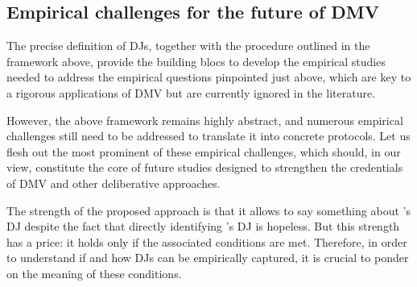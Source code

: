 \documentclass[version=3.21, pagesize, twoside=off, bibliography=totoc, DIV=calc, fontsize=12pt, a4paper, french, english]{scrartcl}
\begin{document}

\subsection{Empirical challenges for the future of \ac{DMV}}

The precise definition of \acp{DJ}, together with the procedure outlined in the framework above, provide the building blocs to develop the empirical studies needed to address the empirical questions pinpointed just above, which are key to a rigorous applications of \ac{DMV} but are currently ignored in the literature.


However, the above framework remains highly abstract, and numerous empirical challenges still need to be addressed to translate it into concrete protocols. Let us flesh out the most prominent of these empirical challenges, which should, in our view, constitute the core of future studies designed to strengthen the credentials of \ac{DMV} and other deliberative approaches. 

The strength of the proposed approach is that it allows to say something about \thedm’s \ac{DJ} despite the fact that directly identifying \thedm’s \ac{DJ} is hopeless. 
But this strength has a price: it holds only if the associated conditions are met. 
Therefore, in order to understand if and how \acp{DJ} can be empirically captured, it is crucial to ponder on the meaning of these conditions.
\end{document}
